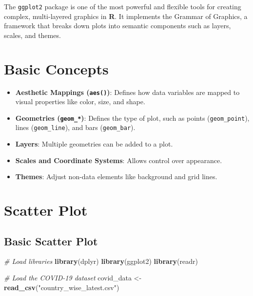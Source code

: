 \documentclass[
]{book}
\newenvironment{Shaded}{\begin{snugshade}}{\end{snugshade}}
\newcommand{\CommentTok}[1]{\textcolor[rgb]{0.56,0.35,0.01}{\textit{#1}}}
\newcommand{\FunctionTok}[1]{\textcolor[rgb]{0.13,0.29,0.53}{\textbf{#1}}}
\newcommand{\NormalTok}[1]{#1}
\newcommand{\OtherTok}[1]{\textcolor[rgb]{0.56,0.35,0.01}{#1}}
\newcommand{\StringTok}[1]{\textcolor[rgb]{0.31,0.60,0.02}{#1}}
\providecommand{\tightlist}{%
  \setlength{\itemsep}{0pt}\setlength{\parskip}{0pt}}
\begin{document}
The \texttt{ggplot2} package is one of the most powerful and flexible tools for creating complex, multi-layered graphics in \textbf{R}. It implements the Grammar of Graphics, a framework that breaks down plots into semantic components such as layers, scales, and themes.

\section{Basic Concepts}\label{basic-concepts}

\begin{itemize}
\tightlist
\item
  \textbf{Aesthetic Mappings (\texttt{aes()})}: Defines how data variables are mapped to visual properties like color, size, and shape.
\item
  \textbf{Geometries (\texttt{geom\_*})}: Defines the type of plot, such as points (\texttt{geom\_point}), lines (\texttt{geom\_line}), and bars (\texttt{geom\_bar}).
\item
  \textbf{Layers}: Multiple geometries can be added to a plot.
\item
  \textbf{Scales and Coordinate Systems}: Allows control over appearance.
\item
  \textbf{Themes}: Adjust non-data elements like background and grid lines.
\end{itemize}

\section{Scatter Plot}\label{scatter-plot}

\subsection{Basic Scatter Plot}\label{basic-scatter-plot}

\begin{Shaded}
\begin{Highlighting}[]
\CommentTok{\# Load libraries}
\FunctionTok{library}\NormalTok{(dplyr)}
\FunctionTok{library}\NormalTok{(ggplot2)}
\FunctionTok{library}\NormalTok{(readr)}

\CommentTok{\# Load the COVID{-}19 dataset}
\NormalTok{covid\_data }\OtherTok{\textless{}{-}} \FunctionTok{read\_csv}\NormalTok{(}\StringTok{"country\_wise\_latest.csv"}\NormalTok{)}
\end{Highlighting}
\end{Shaded}
\end{document}
